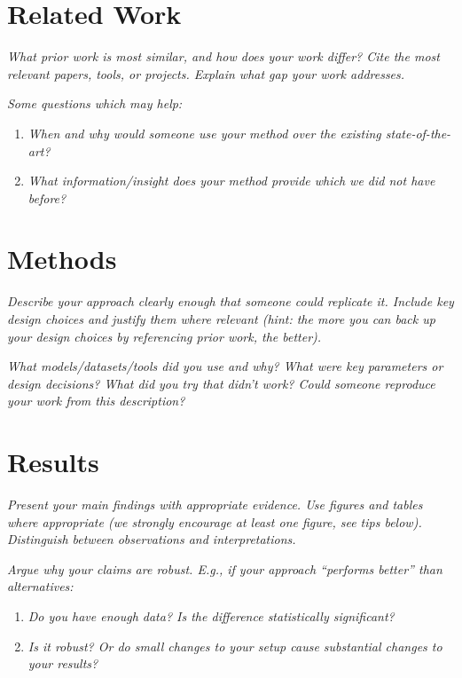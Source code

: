 \documentclass[11pt]{article}
\begin{document}
\section{Related Work}

\textit{What prior work is most similar, and how does your work differ?
Cite the most relevant papers, tools, or projects. Explain what gap your work addresses.}

\textit{Some questions which may help:}

\begin{enumerate}[label=\arabic*)]
  \item \textit{When and why would someone use your method over the existing state-of-the-art?}
  \item \textit{What information/insight does your method provide which we did not have before?}
\end{enumerate}

\section{Methods}

\textit{Describe your approach clearly enough that someone could replicate it. Include key
design choices and justify them where relevant (hint: the more you can back up your design
choices by referencing prior work, the better).}

\textit{What models/datasets/tools did you use and why? What were key parameters or design
decisions? What did you try that didn't work? Could someone reproduce your work from this
description?}

\section{Results}

\textit{Present your main findings with appropriate evidence. Use figures and tables where
appropriate (we strongly encourage at least one figure, see tips below). Distinguish between
observations and interpretations.}

\textit{Argue why your claims are robust. E.g., if your approach ``performs better'' than
alternatives:}

\begin{enumerate}[label=\arabic*)]
  \item \textit{Do you have enough data? Is the difference statistically significant?}
  \item \textit{Is it robust? Or do small changes to your setup cause substantial changes to
  your results?}
\end{enumerate}
\end{document}

